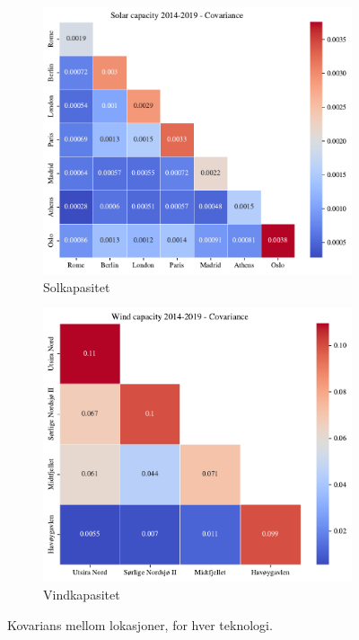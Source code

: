 \documentclass{article}
\begin{document}
\begin{figure}[h]
\centering
\begin{subfigure}{.5\textwidth}
    \centering
    \includegraphics[width=\linewidth]{oblig/figures/Solar/Solar capacity 2014-2019 - Covariance.pdf}
    \caption{Solkapasitet}
    \label{fig:cov_sol}
\end{subfigure}%
\begin{subfigure}{.5\textwidth}
    \centering
    \includegraphics[width=\linewidth]{oblig/figures/Wind/Wind capacity 2014-2019 - Covariance.pdf}
    \caption{Vindkapasitet}
    \label{fig:cov_vind}
\end{subfigure}
\caption{Kovarians mellom lokasjoner, for hver teknologi.}
\label{fig:covariance}
\end{figure}
\end{document}
